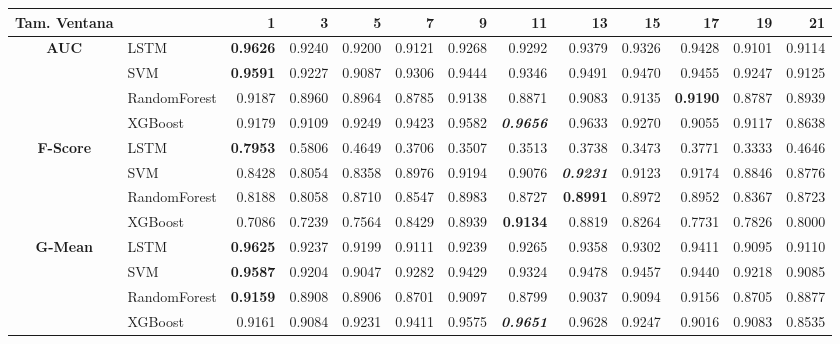 \begin{table}[H]
	\centering
	\begin{adjustbox}{max width=14cm}
		\begin{tabular}{|c|l|r|r|r|r|r|r|r|r|r|r|r|}
			
			\hline
			\textbf{Tam. Ventana}&         &      1  &      3  &      5  &      7  &      9  &      11 &      13 &      15 &      17 &      19 &      21 \\
			\hline
			\textbf{AUC} & LSTM &  \textbf{0.9626} &  0.9240 &  0.9200 &  0.9121 &  0.9268 &  0.9292 &  0.9379 &  0.9326 &  0.9428 &  0.9101 &  0.9114 \\
			& SVM &  \textbf{0.9591} &  0.9227 &  0.9087 &  0.9306 &  0.9444 &  0.9346 &  0.9491 &  0.9470 &  0.9455 &  0.9247 &  0.9125 \\
			& RandomForest &  0.9187 &  0.8960 &  0.8964 &  0.8785 &  0.9138 &  0.8871 &  0.9083 &  0.9135 &  \textbf{0.9190} &  0.8787 &  0.8939 \\
			& XGBoost &  0.9179 &  0.9109 &  0.9249 &  0.9423 &  0.9582 &  \textit{\textbf{0.9656}} &  0.9633 &  0.9270 &  0.9055 &  0.9117 &  0.8638 \\
			\hline
			\textbf{F-Score} & LSTM &  \textbf{0.7953} &  0.5806 &  0.4649 &  0.3706 &  0.3507 &  0.3513 &  0.3738 &  0.3473 &  0.3771 &  0.3333 &  0.4646 \\
			& SVM &  0.8428 &  0.8054 &  0.8358 &  0.8976 &  0.9194 &  0.9076 &  \textit{\textbf{0.9231}} &  0.9123 &  0.9174 &  0.8846 &  0.8776 \\
			& RandomForest &  0.8188 &  0.8058 &  0.8710 &  0.8547 &  0.8983 &  0.8727 &  \textbf{0.8991} &  0.8972 &  0.8952 &  0.8367 &  0.8723 \\
			& XGBoost &  0.7086 &  0.7239 &  0.7564 &  0.8429 &  0.8939 &  \textbf{0.9134} &  0.8819 &  0.8264 &  0.7731 &  0.7826 &  0.8000 \\
			\hline
			\textbf{G-Mean} & LSTM &  \textbf{0.9625} &  0.9237 &  0.9199 &  0.9111 &  0.9239 &  0.9265 &  0.9358 &  0.9302 &  0.9411 &  0.9095 &  0.9110 \\
			& SVM &  \textbf{0.9587} &  0.9204 &  0.9047 &  0.9282 &  0.9429 &  0.9324 &  0.9478 &  0.9457 &  0.9440 &  0.9218 &  0.9085 \\
			& RandomForest &  \textbf{0.9159} &  0.8908 &  0.8906 &  0.8701 &  0.9097 &  0.8799 &  0.9037 &  0.9094 &  0.9156 &  0.8705 &  0.8877 \\
			& XGBoost &  0.9161 &  0.9084 &  0.9231 &  0.9411 &  0.9575 &  \textit{\textbf{0.9651}} &  0.9628 &  0.9247 &  0.9016 &  0.9083 &  0.8535 \\

\end{tabular}
\end{adjustbox}
\end{table}
